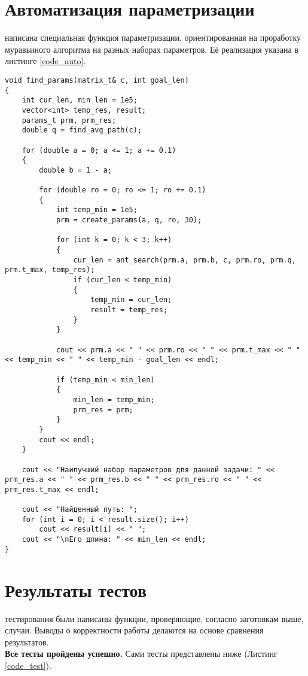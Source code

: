 \section{Автоматизация параметризации}
 написана специальная функция параметризации, ориентированная на проработку муравьиного алгоритма на разных наборах параметров. Её реализация указана в листинге \ref{code_auto}.\\

\begin{lstlisting}[label=code_auto, caption = Функция параметризации]
void find_params(matrix_t& c, int goal_len)
{
	int cur_len, min_len = 1e5;
	vector<int> temp_res, result;
	params_t prm, prm_res;
	double q = find_avg_path(c);
	
	for (double a = 0; a <= 1; a += 0.1)
	{
		double b = 1 - a;
		
		for (double ro = 0; ro <= 1; ro += 0.1)
		{
			int temp_min = 1e5;
			prm = create_params(a, q, ro, 30);
			
			for (int k = 0; k < 3; k++)
			{
				cur_len = ant_search(prm.a, prm.b, c, prm.ro, prm.q, prm.t_max, temp_res);
				if (cur_len < temp_min)
				{
					temp_min = cur_len;
					result = temp_res;
				}
			}
			
			cout << prm.a << " " << prm.ro << " " << prm.t_max << " " << temp_min << " " << temp_min - goal_len << endl;
			
			if (temp_min < min_len)
			{
				min_len = temp_min;
				prm_res = prm;
			}
		}
		cout << endl;
	}
	
	cout << "Наилучший набор параметров для данной задачи: " << prm_res.a << " " << prm_res.b << " " << prm_res.ro << " " << prm_res.t_max << endl;
	
	cout << "Найденный путь: ";
	for (int i = 0; i < result.size(); i++)
		cout << result[i] << " ";
	cout << "\nЕго длина: " << min_len << endl;
}
\end{lstlisting}

\section{Результаты тестов}
 тестирования были написаны функции, проверяющие, согласно заготовкам выше, случаи. Выводы о корректности работы делаются на основе сравнения результатов.\\

\textbf{Все тесты пройдены успешно.} Сами тесты представлены ниже (Листинг \ref{code_test}).\\

